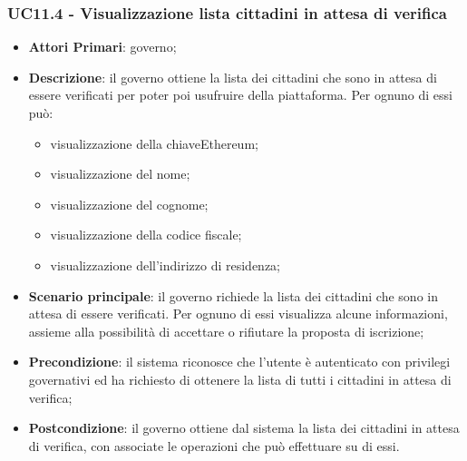 \subsubsection{UC11.4 - Visualizzazione lista cittadini in attesa di verifica}
\begin{itemize}
	\item \textbf{Attori Primari}: governo;
	\item \textbf{Descrizione}: il governo ottiene la lista dei cittadini che sono in attesa di essere verificati per poter poi usufruire della piattaforma. Per ognuno di essi può:
	\begin{itemize}
		\item visualizzazione della chiave\glosp Ethereum;
		\item visualizzazione del nome;
		\item visualizzazione del cognome;
		\item visualizzazione della codice fiscale;
		\item visualizzazione dell'indirizzo di residenza;
	\end{itemize}
	\item \textbf{Scenario principale}: il governo richiede la lista dei cittadini che sono in attesa di essere verificati. Per ognuno di essi visualizza alcune informazioni, assieme alla possibilità di accettare o rifiutare la proposta di iscrizione;
	\item \textbf{Precondizione}: il sistema riconosce che l'utente è autenticato con privilegi governativi ed ha richiesto di ottenere la lista di tutti i cittadini in attesa di verifica;
	\item \textbf{Postcondizione}: il governo ottiene dal sistema la lista dei cittadini in attesa di verifica, con associate le operazioni che può effettuare su di essi.
\end{itemize}
